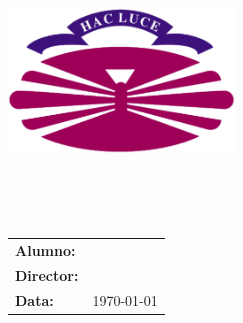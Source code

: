 %
%
\begin{titlepage}
	\begin{center}
		\includegraphics[width=6cm]{./eps/logo_udc.eps}
		\vspace{2cm}

		{\Large{\textbf{\centro}}}
		\\
		{\it \large{\textbf{\departamento}}}
		\vspace{1cm}

		{\large {\sc \proyecto}\\{\curso}}
		\vspace{1cm}

		\textbf{\Large \titulogalego}
		\vspace{6cm}
	\end{center}

	\begin{flushright}
		\begin{tabular}{ll}
			\large{\textbf{Alumno:}}	&
			\large{\autor} \\

			\large{\textbf{Director:}}	&
			\large{\director} \\


			\large{\textbf{Data:}}		&
			\large{\today} \\
		\end{tabular}
	\end{flushright}
\end{titlepage}
